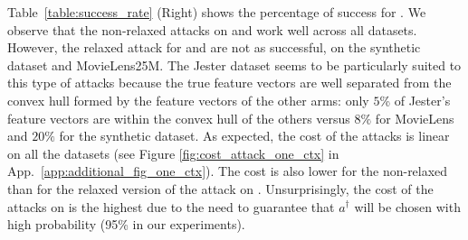  Table~\ref{table:success_rate} (Right) shows the percentage of success for . We observe that the non-relaxed attacks on \epsgreedy and \linucb work well across all datasets. %
 However, the relaxed attack %
 for \linucb and \lints are not as successful, on the synthetic dataset and MovieLens25M. 
 The Jester dataset seems to be particularly suited to this type of attacks because the true feature vectors are well separated from the convex hull formed by the feature vectors of the other arms: only $5$\% of Jester's feature vectors are within the convex hull of the others versus $8\%$ for MovieLens and $20\%$ for the synthetic dataset.
 As expected, the cost of the attacks is linear on all the datasets (see Figure \ref{fig:cost_attack_one_ctx} in App.~\ref{app:additional_fig_one_ctx}). The cost is also lower for the non-relaxed than for the relaxed version of the attack on \linucb. Unsurprisingly, the cost of the attacks on \lints is the highest %
due to the need to guarantee that %
$a^{\dagger}$ will be chosen with high probability (95\% in our experiments).

